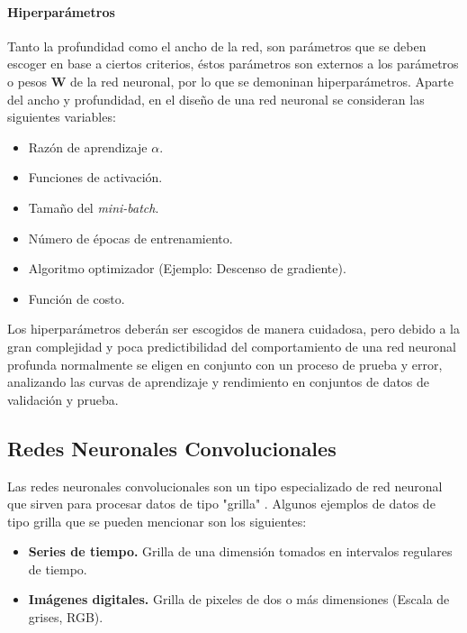             \paragraph{Hiperparámetros}
            Tanto la profundidad como el ancho de la red, son parámetros que se deben escoger en base a ciertos criterios, 
            éstos parámetros son externos a los parámetros o pesos $\mathbf{W}$ de la red neuronal, por lo que se demoninan
            hiperparámetros. Aparte del ancho y profundidad, en el diseño de una red neuronal se consideran las siguientes 
            variables:

            \begin{itemize}
                \item Razón de aprendizaje $\alpha$.
                \item Funciones de activación.
                \item Tamaño del \textit{mini-batch}.
                \item Número de épocas de entrenamiento.
                \item Algoritmo optimizador (Ejemplo: Descenso de gradiente).
                \item Función de costo.
            \end{itemize}

            Los hiperparámetros deberán ser escogidos de manera cuidadosa, pero debido a la gran complejidad y poca predictibilidad
            del comportamiento de una red neuronal profunda normalmente se eligen en conjunto con un proceso de prueba y error, 
            analizando las curvas de aprendizaje y rendimiento en conjuntos de datos de validación y prueba.

    \subsection{Redes Neuronales Convolucionales} \label{sec:convnet}
    Las redes neuronales convolucionales son un tipo especializado de red neuronal que 
    sirven para procesar datos de tipo "grilla" \cite{Goodfellow-et-al-2016}. Algunos ejemplos 
    de datos de tipo grilla que se pueden mencionar son los siguientes:
    \begin{itemize}
        \item \textbf{Series de tiempo.} Grilla de una dimensión tomados en intervalos regulares de tiempo.
        \item \textbf{Imágenes digitales.} Grilla de pixeles de dos o más dimensiones (Escala de grises, RGB).
    \end{itemize}

